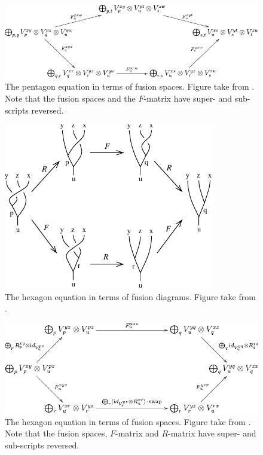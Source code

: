 \begin{figure}[!htb]
  \centering
  \includegraphics[width=1\linewidth]{img/pentagon_space.pdf}
  \caption{The pentagon equation in terms of fusion spaces. Figure take from \cite{kitaev}. Note that the fusion spaces and the $F$-matrix have super- and sub-scripts reversed.}
  \label{fig:pentagon_space}
\end{figure}

\begin{figure}[!htb]
  \centering
  \includegraphics[width=0.8\linewidth]{img/hexagon_diagram.pdf}
  \caption{The hexagon equation in terms of fusion diagrams. Figure take from \cite{kitaev}.}
  \label{fig:hexagon_diagram}
\end{figure}

\begin{figure}[!htb]
  \centering
  \includegraphics[width=1\linewidth]{img/hexagon_space.pdf}
  \caption{The hexagon equation in terms of fusion spaces. Figure take from \cite{kitaev}. Note that the fusion spaces, $F$-matrix and $R$-matrix have super- and sub-scripts reversed.}
  \label{fig:hexagon_space}
\end{figure}


\clearpage


